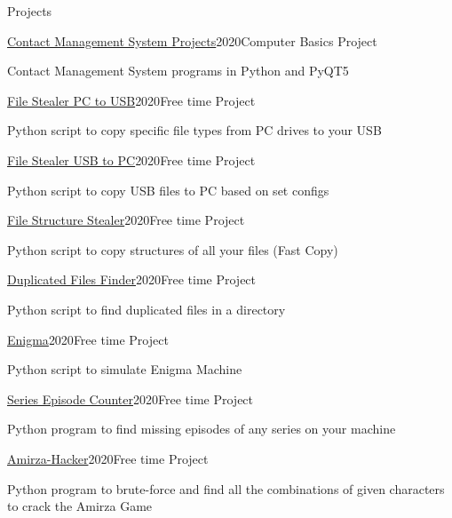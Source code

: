 \documentclass{resume} %
\begin{document}
\begin{rSection}{Projects}
        \begin{rSubsection}{\href{https://github.com/bestmahdi2/ContactManagementSystem}{Contact Management System Projects}}{2020}{Computer Basics Project}{ }
            \item Contact Management System programs in Python and PyQT5
        \end{rSubsection}
        \begin{rSubsection}{\href{https://github.com/bestmahdi2/FileStealerPC2USB}{File Stealer PC to USB}}{2020}{Free time Project}{ }
            \item Python script to copy specific file types from PC drives to your USB
        \end{rSubsection}
        \begin{rSubsection}{\href{https://github.com/bestmahdi2/FileStealerUSB2PC}{File Stealer USB to PC}}{2020}{Free time Project}{ }
            \item Python script to copy USB files to PC based on set configs
        \end{rSubsection}
        \begin{rSubsection}{\href{https://github.com/bestmahdi2/FileStructureStealer}{File Structure Stealer}}{2020}{Free time Project}{ }
            \item Python script to copy structures of all your files (Fast Copy)
        \end{rSubsection}
        \begin{rSubsection}{\href{https://github.com/bestmahdi2/DuplicatedFinder}{Duplicated Files Finder}}{2020}{Free time Project}{ }
            \item Python script to find duplicated files in a directory
        \end{rSubsection}
        \begin{rSubsection}{\href{https://github.com/bestmahdi2/Enigma}{Enigma}}{2020}{Free time Project}{ }
            \item Python script to simulate Enigma Machine
        \end{rSubsection}
        \begin{rSubsection}{\href{https://github.com/bestmahdi2/SeriesEpisodeCounter}{Series Episode Counter}}{2020}{Free time Project}{ }
            \item Python program to find missing episodes of any series on your machine
        \end{rSubsection}
        \begin{rSubsection}{\href{https://github.com/bestmahdi2/AmirzaHacker}{Amirza-Hacker}}{2020}{Free time Project}{ }
            \item Python program to brute-force and find all the combinations of given characters to crack the Amirza Game
        \end{rSubsection}
    \end{rSection}
\end{document}
